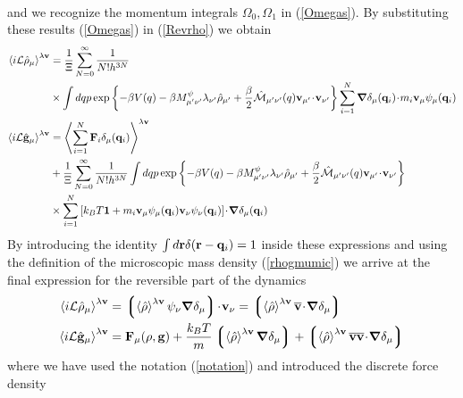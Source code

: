 \documentclass[b5paper,openright,11pt]{book}
\newcommand{\esc}{\!\cdot\!}
\newcommand{\llangle}{\left\langle}
\newcommand{\rrangle}{\right\rangle}
\newcommand{\llg}{\left\lgroup}
\newcommand{\rlg}{\right\rgroup}
\begin{document}
\begin{appendices}
\begin{align}
\label{Revrho}
\end{align}
and  we  recognize  the   momentum  integrals  $\Omega_0,\Omega_1$  in
(\ref{Omegas}).   By  substituting  these  results  (\ref{Omegas})  in
(\ref{Revrho}) we obtain
\begin{align}
  \llangle i{\cal L}\hat{\rho}_\mu\rrangle^{\lambda{\bf v}} &= 
\frac{1}{\Xi} \sum_{N=0}^\infty \frac{1}{N!h^{3N}} \nonumber \\
&\times \int dq p 
\exp\left\{-\beta V(q)-\beta M^\psi_{\mu' \nu'}\lambda_{\nu'}\hat{\rho}_{\mu'}
+\frac{\beta}{2}\hat{\cal M}_{\mu'\nu'}(q){\bf v}_{\mu'} \esc{\bf v}_{\nu'}\right\}\sum_{i=1}^N\boldsymbol{\nabla}\delta_\mu({\bf q}_i)\esc m_i{\bf v}_\mu\psi_\mu({\bf q}_i)
\nonumber\\
  \llangle i{\cal L}\hat{\bf g}_\mu\rrangle^{\lambda{\bf v}} &=
  \llangle \sum_{i=1}^N{\bf F}_i\delta_\mu({\bf q}_i)\rrangle^{\lambda{\bf v}}
\nonumber \\
  &+\frac{1}{\Xi} \sum_{N=0}^\infty \frac{1}{N!h^{3N}}\int dq p 
\exp\left\{-\beta V(q)-\beta M^\psi_{\mu'\nu'}\lambda_{\nu'}\hat{\rho}_{\mu'}+\frac{\beta}{2}\hat{\cal M}_{\mu'\nu'}(q){\bf v}_{\mu'} \esc{\bf v}_{\nu'}\right\}
\nonumber\\
&\times \sum_{i=1}^N\left[k_BT{\bf 1} 
+ 
m_i{\bf v}_\mu\psi_{\mu}({\bf q}_i)
{\bf v}_\nu\psi_{\nu}({\bf q}_i)\right]
\esc\boldsymbol{\nabla}\delta_\mu({\bf q}_i)
\label{Revrho3}
\end{align}
By introducing the identity $\int d{\bf r}\delta({\bf r}-{\bf q}_i)=1$
inside these expressions  and using the definition  of the microscopic
mass density (\ref{rhogmumic}) we arrive at the final expression for
the reversible part of the dynamics
\begin{align}
  \llangle i{\cal L}\hat{\rho}_\mu\rrangle^{\lambda{\bf v}} &=   \llg\llangle \hat{\rho}\rrangle^{\lambda{\bf v}}\psi_\nu\boldsymbol{\nabla}\delta_\mu \rlg\esc  {\bf v}_\nu
=  \llg\llangle \hat{\rho}\rrangle^{\lambda{\bf v}}\overline{\bf v}\esc  \boldsymbol{\nabla}\delta_\mu \rlg
\nonumber\\
  \llangle i{\cal L}\hat{\bf g}_\mu\rrangle^{\lambda{\bf v}} &={\bf F}_\mu(\rho,{\bf g})
+ \frac{k_BT}{m} \llg \llangle\hat{\rho}\rrangle^{\lambda{\bf v}}\boldsymbol{\nabla}\delta_\mu\rlg
+\llg\llangle \hat{\rho}\rrangle^{\lambda{\bf v}}\overline{\bf v}\overline{\bf v}\esc
\boldsymbol{\nabla}\delta_{\mu}\rlg 
\end{align}
where we have used the notation (\ref{notation}) and introduced the discrete force density 
\begin{align}

\end{align}
\end{appendices}
\end{document}

